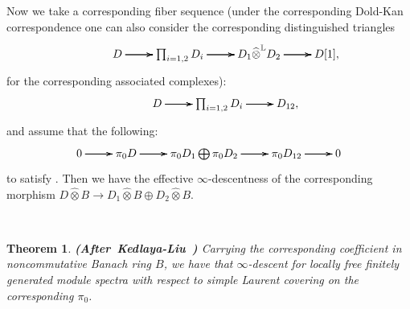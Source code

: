 \documentclass[12pt]{amsart}
\newtheorem{theorem}{Theorem}[section]
\theoremstyle{definition}
\numberwithin{equation}{section}
\begin{document}
\indent Now we take a corresponding fiber sequence (under the corresponding Dold-Kan correspondence one can also consider the corresponding distinguished triangles 
\[
\xymatrix@C+0pc@R+0pc{
&D \ar[r]\ar[r]\ar[r] &\prod_{i=1,2} D_i \ar[r]\ar[r]\ar[r] & D_{1}\widehat{\otimes}^\mathbb{L} D_{2} \ar[r]\ar[r]\ar[r] & D[1],
}
\]
for the corresponding associated complexes):
\[
\xymatrix@C+0pc@R+0pc{
&D \ar[r]\ar[r]\ar[r] &\prod_{i=1,2} D_i \ar[r]\ar[r]\ar[r] & D_{12},
}
\]
and assume that the following:
\[
\xymatrix@C+0pc@R+0pc{
0   \ar[r]\ar[r]\ar[r] &\pi_0D \ar[r]\ar[r]\ar[r] &\pi_0D_1\bigoplus \pi_0D_2 \ar[r]\ar[r]\ar[r] & \pi_0D_{12} \ar[r]\ar[r]\ar[r] &0
}
\]
to satisfy \cite[Definition 2.7.3, condition (a), (b)]{KL1}. Then we have the effective $\infty$-descentness of the corresponding morphism $D\widehat{\otimes}B\rightarrow D_1\widehat{\otimes}B\oplus D_2\widehat{\otimes}B$.





\

\begin{theorem} \mbox{\bf{(After Kedlaya-Liu \cite[Theorem 2.7.7]{KL1})}}
Carrying the corresponding coefficient in noncommutative Banach ring $B$, we have that $\infty$-descent for locally free finitely generated module spectra with respect to simple Laurent covering on the corresponding $\pi_0$.	
\end{theorem}
\end{document}
